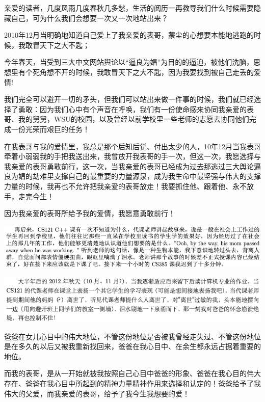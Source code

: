 \documentclass[9pt, b5paper]{article}
\begin{document}
亲爱的读者，几度风雨几度春秋几多愁，生活的阅历一再教导我们什么时候需要隐藏自己，可为什么我们会想要一次又一次地站出来？

2010年12月当明确地知道自己爱上了我亲爱的表哥，蒙尘的心想要本能地逃跑的时候，我敢冒天下之大不匙；

今年春天，当受到三大中文网站舆论以“逼良为娼”为目的的逼迫，被他们洗脑，思想里有个死角想不开的时候，我敢冒天下之大不匙，因为我要找到被自己走丢的爱情!

我们完全可以避开一切的矛头，但我们可以站出来做一件事的时候，我们就已经选择了勇敢：因为我们心中有个声音在呼唤，我们有一份使命感来协同我亲爱的表哥、我的舅舅，WSU的校园，以及曾经以前学校里一些老师的志愿去协同他们完成一份光荣而艰巨的任务！

在我表哥与我的爱情里，我总是那个后知后觉、付出太少的人，10年12月当我表哥牵着小弱弱我的手把我送出来，我曾放开我表哥的手一次，但这一次，我愿选择与我亲爱的表哥勇敢前行，这一次，当我亲爱的表哥已经成为过去那逃过三大舆论逼良为娼的劫难里支撑自己的最重要的力量源泉，成为我生命中最坚强与伟大的支撑力量的时候，我再也不允许把我亲爱的表哥放走！我要抓住他、跟着他、永不放手，走完今生！

因为我亲爱的表哥所给予我的爱情，我愿意勇敢前行！

\begin{center}
\includegraphics[width=.9\linewidth]{./pic/backups_plans_20210424_205104.png}
\end{center}

\begin{center}
\includegraphics[width=.9\linewidth]{./pic/backups_plans_20210424_205605.png}
\end{center}

爸爸在女儿心目中的伟大地位，不管这份地位是否被我曾经走失过、不管这份地位是在多久的以后又被我重新找回来，爸爸在我心目中、在余生都永远占据着重要的地位。

而我的表哥，是从一开始就被我按照自己心目中爸爸的形象、爸爸在我心目的伟大存在、爸爸在我心目中所起到的精神力量精神作用来选择和认定的！爸爸给予了我伟大的父爱，而我亲爱的表哥，给予了我今生我想要的爱！
\end{document}
